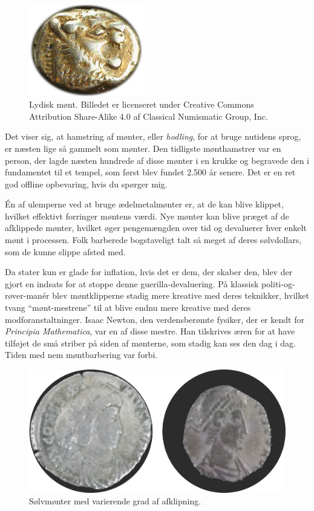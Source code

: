 \documentclass[paper=6in:9in,pagesize=pdftex,headinclude=on,footinclude=on,12pt]{scrbook}
\begin{document}
\begin{figure}
  \centering
  \includegraphics[width=5cm]{assets/images/lydian-coin-stater.png}
  \caption{Lydisk mønt. Billedet er licenseret under Creative Commons Attribution Share-Alike 4.0 af Classical Numismatic Group, Inc.}
  \label{fig:lydian-coin-stater}
\end{figure}

Det viser sig, at hamstring af mønter, eller \textit{hodling}, for at bruge nutidens sprog, er næsten lige så gammelt som mønter. Den tidligste mønthamstrer var en person, der lagde næsten hundrede af disse mønter i en krukke og begravede den i fundamentet til et tempel, som først blev fundet 2.500 år senere. Det er en ret god offline opbevaring, hvis du spørger mig.

Én af ulemperne ved at bruge ædelmetalmønter er, at de kan blive klippet, hvilket effektivt forringer møntens værdi. Nye mønter kan blive præget af de afklippede mønter, hvilket øger pengemængden over tid og devaluerer hver enkelt mønt i processen. Folk barberede bogstaveligt talt så meget af deres sølvdollars, som de kunne slippe afsted med.

Da stater kun er glade for inflation, hvis det er dem, der skaber den, blev der gjort en indsats for at stoppe denne guerilla-devaluering. På klassisk politi-og-røver-man\'er blev møntklipperne stadig mere kreative med deres teknikker, hvilket tvang \enquote{mønt-mestrene} til at blive endnu mere kreative med deres modforanstaltninger. Isaac Newton, den verdensberømte fysiker, der er kendt for \textit{Principia Mathematica}, var en af disse mestre. Han tilskrives æren for at have tilføjet de små striber på siden af mønterne, som stadig kan ses den dag i dag. Tiden med nem møntbarbering var forbi.\begin{figure}
  \includegraphics{assets/images/clipped-coins.png}
  \caption{Sølvmønter med varierende grad af afklipning.}
  \label{fig:clipped-coins}
\end{figure}
\end{document}
